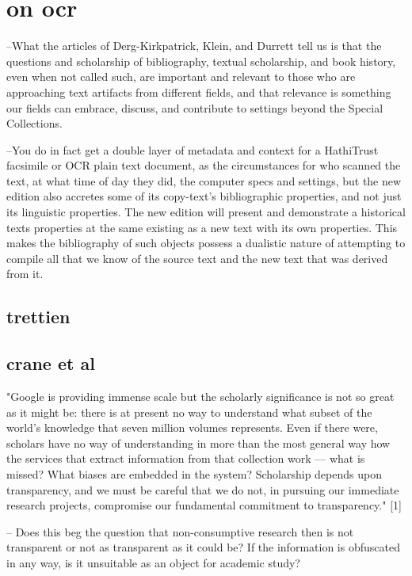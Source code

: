 \documentclass[course, english]{Notes}
\newcommand{\n}{\scalebox{2}{\textbf{\framebox{$\aleph$}}}}
\begin{document}
\section{on ocr}
\n --What the articles of Derg-Kirkpatrick, Klein, and Durrett tell us is that the questions and scholarship of bibliography, textual scholarship, and book history, even when not called such, are important and relevant to those who are approaching text artifacts from different fields, and that relevance is something our fields can embrace, discuss, and contribute to settings beyond the Special Collections. 

\n --You do in fact get a double layer of metadata and context for a HathiTrust facsimile or OCR plain text document, as the circumstances for who scanned the text, at what time of day they did, the computer specs and settings, but the new edition also accretes some of its copy-text's bibliographic properties, and not just its linguistic properties. The new edition will present and demonstrate a historical texts properties at the same existing as a new text with its own properties. This makes the bibliography of such objects possess a dualistic nature of attempting to compile all that we know of the source text and the new text that was derived from it.

\subsection{trettien}
 

\subsection{crane et al}
 "Google is providing immense scale but the scholarly significance is not so great as it might be: there is at present no way to understand what subset of the world’s knowledge that seven million volumes represents. Even if there were, scholars have no way of understanding in more than the most general way how the services that extract information from that collection work — what is missed? What biases are embedded in the system? Scholarship depends upon transparency, and we must be careful that we do not, in pursuing our immediate research projects, compromise our fundamental commitment to transparency." [1]


	-- {Does this beg the question that non-consumptive research then is not transparent or not as transparent as it could be? If the information is obfuscated in any way, is it unsuitable as an object for academic study?}
	
\end{document}
